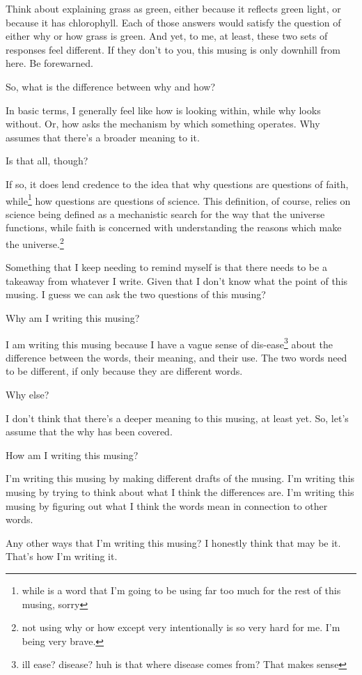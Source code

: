 \documentclass[12pt]{article}[titlepage]
\renewcommand{\,}{\textsuperscript{,}}
\begin{document}
Think about explaining grass as green, either because it reflects green light, or because it has chlorophyll.
Each of those answers would satisfy the question of either why or how grass is green.
And yet, to me, at least, these two sets of responses feel different.
If they don't to you, this musing is only downhill from here.
Be forewarned.

So, what is the difference between why and how?

In basic terms, I generally feel like how is looking within, while why looks without.
Or, how asks the mechanism by which something operates.
Why assumes that there's a broader meaning to it.

Is that all, though?

If so, it does lend credence to the idea that why questions are questions of faith, while\footnote{while is a word that I'm going to be using far too much for the rest of this musing, sorry} how questions are questions of science.
This definition, of course, relies on science being defined as a mechanistic search for the way that the universe functions, while faith is concerned with understanding the reasons which make the universe.\footnote{not using why or how except very intentionally is so very hard for me. I'm being very brave.}

Something that I keep needing to remind myself is that there needs to be a takeaway from whatever I write.
Given that I don't know what the point of this musing.
I guess we can ask the two questions of this musing?

Why am I writing this musing?

I am writing this musing because I have a vague sense of dis-ease\footnote{ill ease? disease? huh is that where disease comes from? That makes sense} about the difference between the words, their meaning, and their use.
The two words need to be different, if only because they are different words.

Why else?

I don't think that there's a deeper meaning to this musing, at least yet.
So, let's assume that the why has been covered.

How am I writing this musing?

I'm writing this musing by making different drafts of the musing.
I'm writing this musing by trying to think about what I think the differences are.
I'm writing this musing by figuring out what I think the words mean in connection to other words.

Any other ways that I'm writing this musing?
I honestly think that may be it.
That's how I'm writing it.
\end{document}
